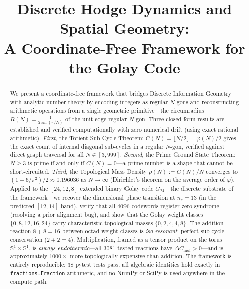 \documentclass[11pt,a4paper]{article}
\title{Discrete Hodge Dynamics and Spatial Geometry:\\
A Coordinate-Free Framework for the Golay Code}
\author{}
\date{}
\begin{document}
\maketitle

\begin{abstract}
We present a coordinate-free framework that bridges Discrete Information
Geometry with analytic number theory by encoding integers as regular
$N$-gons and reconstructing arithmetic operations from a single geometric
primitive—the circumradius $R(N) = \tfrac{1}{2\sin(\pi/N)}$ of the
unit-edge regular $N$-gon. Three closed-form results are established and
verified computationally with zero numerical drift (using exact rational
arithmetic). \emph{First}, the Totient Sub-Cycle Theorem:
$C(N) = \lfloor N/2 \rfloor - \varphi(N)/2$ gives the exact count of
internal diagonal sub-cycles in a regular $N$-gon, verified against direct
graph traversal for all $N \in [3, 999]$. \emph{Second}, the Prime Ground
State Theorem: $N \geq 3$ is prime if and only if $C(N) = 0$—a prime
number is a shape that cannot be short-circuited. \emph{Third}, the
Topological Mass Density $\rho(N) := C(N)/N$ converges to
$(1 - 6/\pi^2)/2 \approx 0.196036$ as $N \to \infty$ (Dirichlet's
theorem on the average order of $\varphi$). Applied to the
$[24,12,8]$ extended binary Golay code $G_{24}$—the discrete substrate
of the framework—we recover the dimensional phase transition at
$n_c = 13$ (in the predicted $[12,14]$ band), verify that all $4096$
codewords register zero syndrome (resolving a prior alignment bug), and
show that the Golay weight classes $\{0, 8, 12, 16, 24\}$ carry
characteristic topological masses $\{0, 2, 4, 4, 8\}$. The addition
reaction $8 + 8 = 16$ between octad weight classes is \emph{iso-resonant}:
perfect sub-cycle conservation ($2 + 2 = 4$). Multiplication, framed as a
tensor product on the torus $\mathbb{S}^1 \times \mathbb{S}^1$, is
\emph{always endothermic}—all $3081$ tested reactions have
$\Delta C_{\mathrm{mul}} > 0$—and is approximately $1000\times$ more
topologically expensive than addition. The framework is entirely
reproducible: 38 pytest tests pass, all algebraic identities hold exactly
in \texttt{fractions.Fraction} arithmetic, and no NumPy or SciPy is used
anywhere in the compute path.
\end{abstract}

\end{document}
